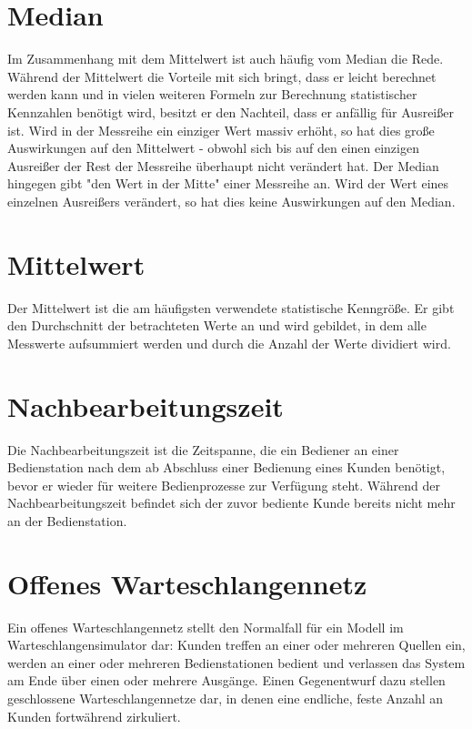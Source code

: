 \section*{Median}


Im Zusammenhang mit dem Mittelwert
ist auch häufig vom Median die Rede. Während der Mittelwert die Vorteile
mit sich bringt, dass er leicht berechnet werden kann und in vielen weiteren
Formeln zur Berechnung statistischer Kennzahlen benötigt wird, besitzt er
den Nachteil, dass er anfällig für Ausreißer ist. Wird in der Messreihe
ein einziger Wert massiv erhöht, so hat dies große Auswirkungen auf den
Mittelwert - obwohl sich bis auf den einen einzigen Ausreißer der Rest
der Messreihe überhaupt nicht verändert hat. Der Median hingegen gibt
"den Wert in der Mitte" einer Messreihe an. Wird der Wert eines einzelnen
Ausreißers verändert, so hat dies keine Auswirkungen auf den Median.

\section*{Mittelwert}


Der Mittelwert ist die am häufigsten verwendete statistische Kenngröße.
Er gibt den Durchschnitt der betrachteten Werte an und wird gebildet, in
dem alle Messwerte aufsummiert werden und durch die Anzahl der Werte
dividiert wird.

\section*{Nachbearbeitungszeit}


Die Nachbearbeitungszeit ist die Zeitspanne, die ein Bediener an einer Bedienstation
nach dem ab Abschluss einer Bedienung eines Kunden benötigt, bevor er wieder für weitere Bedienprozesse zur Verfügung steht.
Während der Nachbearbeitungszeit befindet sich der zuvor bediente Kunde bereits nicht mehr an der Bedienstation.

\section*{Offenes Warteschlangennetz}


Ein offenes Warteschlangennetz stellt den Normalfall für ein Modell im Warteschlangensimulator dar: Kunden
treffen an einer oder mehreren Quellen ein, werden an einer oder
mehreren Bedienstationen bedient und verlassen das System am Ende
über einen oder mehrere Ausgänge. Einen Gegenentwurf dazu stellen
geschlossene Warteschlangennetze dar, in denen eine endliche, feste Anzahl an Kunden fortwährend zirkuliert.

